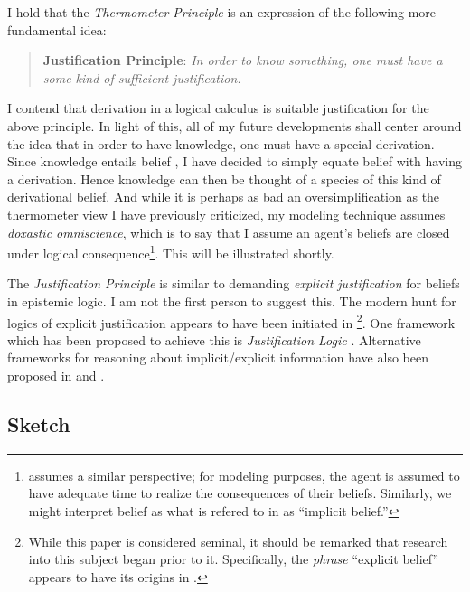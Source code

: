 \documentclass[11pt]{article}
\numberwithin{equation}{subsection}
\begin{document}
I hold that the \emph{Thermometer Principle} is an expression of the following more fundamental idea:
\begin{quote}
 \textbf{Justification Principle}: \emph{In order to know something, one must have a some kind of sufficient justification.}
\end{quote}
I contend that derivation in a logical calculus is suitable
justification for the above principle. In light of this, all of my
future developments shall center around the idea that in order to have
knowledge, one must have a special derivation.  Since knowledge
entails belief \citep[under the traditional view in]{gettier_is_1963},
I have decided to simply equate belief with having a derivation.
Hence knowledge can then be thought of a species of this kind of
derivational belief. And while it is perhaps as bad an
oversimplification as the thermometer view I have previously
criticized, my modeling technique assumes \emph{doxastic omniscience},
which is to say that I assume an agent's beliefs are closed under
logical consequence\footnote{\cite{hintikka_knowledge_1969} assumes a
  similar perspective; for modeling purposes, the agent is assumed to
  have adequate time to realize the consequences of their beliefs.
  Similarly, we might interpret belief as what is refered to in
  \citet{levesque_logic_1984} as ``implicit belief.''}.  This will be illustrated shortly.

The \emph{Justification Principle} is similar to demanding
\emph{explicit justification} for beliefs in epistemic logic. I am not
the first person to suggest this. The modern hunt for logics of
explicit justification appears to have been initiated in
\citet{van_benthem_reflectionsepistemic_1991}\footnote{While this
  paper is considered seminal, it should be remarked that research
  into this subject began prior to it.  Specifically, the
  \emph{phrase} ``explicit belief'' appears to have its origins in
  \citep{levesque_logic_1984}.}. One framework which has been proposed
to achieve this is \emph{Justification Logic}
\citep{artemov_introducing_2005,artemov_justification_2007,fitting_logic_2004,fitting_logic_2005}.
Alternative frameworks for reasoning about implicit/explicit
information have also been proposed in \citet{van_benthem_inference_2009} and
\citet{velzquez-quesada_inference_2009}.


\subsection{Sketch}\label{sketch}
\end{document}
